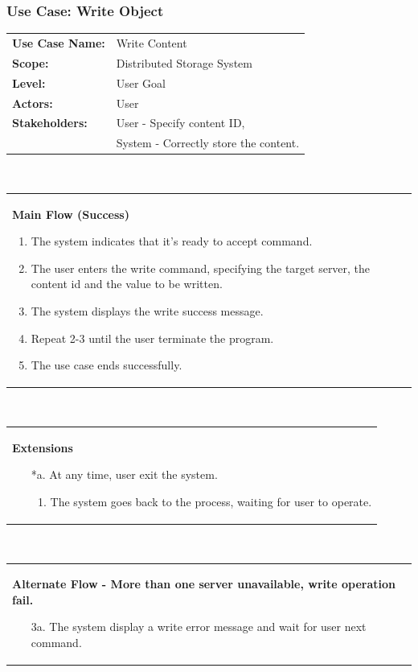 \documentclass[11pt,letterpaper,en-US]{article}
\begin{document}
\subsubsection{Use Case: Write Object}
\begin{tabularx}{\textwidth}{>{\bfseries}lX}
    Use Case Name: & Write Content\\
    Scope: & Distributed Storage System\\
    Level: & User Goal\\
    Actors: & User\\
    Stakeholders: & User - Specify content ID,\\
                  & System - Correctly store the content. \\
\end{tabularx}\\
\begin{tabularx}{\textwidth}{X}
    \textbf{Main Flow (Success)}
    \begin{enumerate}[label={\arabic*.}]
        \item The system indicates that it's ready to accept command.
        \item The user enters the write command, specifying the target
            server, the content id and the value to be written.
        \item The system displays the write success message.
        \item Repeat 2-3 until the user terminate the program.
        \item The use case ends successfully.
    \end{enumerate}
\end{tabularx}\\
\begin{tabularx}{\textwidth}{X}
    \textbf{Extensions}
    \begin{itemize}
        \item[*a.] At any time, user exit the system.
            \begin{enumerate}[label={\arabic*.}]
                \item The system goes back to the process, waiting for user to operate.
            \end{enumerate}
    \end{itemize}
\end{tabularx}\\
\begin{tabularx}{\textwidth}{X}
    \textbf{Alternate Flow - More than one server unavailable, write operation fail.}
    \begin{itemize}
        \item[3a.] The system display a write error message and wait for user next command.
    \end{itemize}
\end{tabularx}\\
\end{document}
